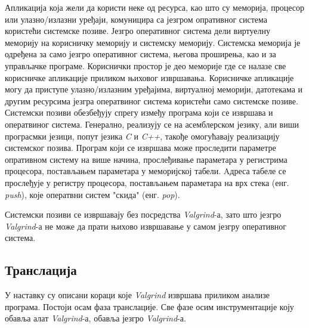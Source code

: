 \documentclass[12pt,oneside]{memoir}
\begin{document}
\indent Апликација која жели да користи неке од ресурса, као што су меморија, процесор или улазно/излазни уређаји, комуницира са језгром опративног система користећи системске позиве. Језгро оперативног система дели виртуелну меморију на корисничку меморију и системску меморију. Системска меморија је одређена за само језгро оперативног система, његова проширења, као и за управљачке програме. Кориснички простор је део меморије где се налазе све корисничке апликације приликом њиховог извршавања. Корисничке апликације могу да приступе улазно/излазним уређајима, виртуалној меморији, датотекама и другим ресурсима језгра оператвиног система користећи само системске позиве. Системски позиви обезбеђују спрегу између програма који се извршава и оператвиног система. Генерално, реализују се на асемблерском језику, али виши програсмки језици, попут језика \textit{C} и \textit{C++}, такође омогућавају реализацију системског позива. Програм који се извршава може проследити параметре опративном систему на више начина, прослеђивање параметара у регистрима процесора, постављањем параметара у меморијској табели. Aдреса табеле се прослеђује у регистру процесора, постављањем параметара на врх стека (енг. \textit{push}), које оператвни систем "скида" (енг. \textit{pop}).

\indent Системски позиви се извршавају без посредства \textit{Valgrind}-а, зато што језгро \textit{Valgrind}-а не може да прати њихово извршавање у самом језгру оперативног система.


\subsection{Транслација}

\indent У наставку су описани кораци које \textit{Valgrind} извршава приликом анализе програма. Постоји осам фаза транслације. Све фазе осим инструментације коју обавља алат \textit{Valgrind}-а, обавља језгро \textit{Valgrind}-а.
\end{document}

